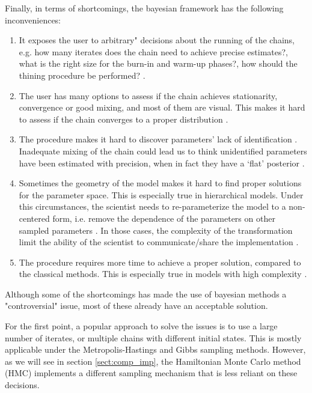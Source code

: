 \noindent Finally, in terms of shortcomings, the bayesian framework has the following inconveniences:

\begin{enumerate}	
	\item It exposes the user to arbitrary" decisions about the running of the chains, e.g. how many iterates does the chain need to achieve precise estimates?, what is the right size for the burn-in and warm-up phases?, how should the thining procedure be performed? \cite{Skrondal_et_al_2004a}. 
	
	\item The user has many options to assess if the chain achieves stationarity, convergence or good mixing, and most of them are visual. This makes it hard to assess if the chain converges to a proper distribution \cite{Gelman_et_al_1996}.
	
	\item The procedure makes it hard to discover parameters' lack of identification \cite{Skrondal_et_al_2004a}. Inadequate mixing of the chain could lead us to think unidentified parameters have been estimated with precision, when in fact they have a `flat' posterior \cite{Keane_1992}.
	
	\item Sometimes the geometry of the model makes it hard to find proper solutions for the parameter space. This is especially true in hierarchical models. Under this circumstances, the scientist needs to re-parameterize the model to a non-centered form, i.e. remove the dependence of the parameters on other sampled parameters \cite{Gorinova_et_al_2019}. In those cases, the complexity of the transformation limit the ability of the scientist to communicate/share the implementation \cite{McElreath_2020}.
		
	\item The procedure requires more time to achieve a proper solution, compared to the classical methods. This is especially true in models with high complexity \cite{Tarazona_2013, Rivera_2019}.
	
\end{enumerate}

\noindent Although some of the shortcomings has made the use of bayesian methods a "controversial" issue, most of these already have an acceptable solution. 

For the first point, a popular approach to solve the issues is to use a large number of iterates, or multiple chains with different initial states. This is mostly applicable under the Metropolis-Hastings and Gibbs sampling methods. However, as we will see in section \ref{sect:comp_imp}, the Hamiltonian Monte Carlo method (HMC) \cite{Betancourt_et_al_2013} implements a different sampling mechanism that is less reliant on these decisions. 

